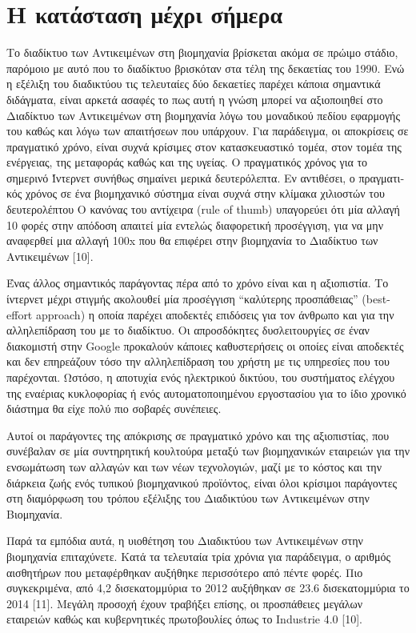 \section{Η κατάσταση μέχρι σήμερα}
Το διαδίκτυο των Αντικειμένων στη βιομηχανία βρίσκεται ακόμα σε πρώιμο στάδιο, παρόμοιο με αυτό που το διαδίκτυο βρισκόταν στα τέλη της δεκαετίας του 1990. Ενώ η εξέλιξη του διαδικτύου τις τελευταίες δύο δεκαετίες παρέχει κάποια σημαντικά διδάγματα, είναι αρκετά ασαφές το πως αυτή η γνώση μπορεί να αξιοποιηθεί στο Διαδίκτυο των Αντικειμένων στη βιομηχανία λόγω του μοναδικού πεδίου εφαρμογής του καθώς και λόγω των απαιτήσεων που υπάρχουν. Για παράδειγμα, οι αποκρίσεις σε πραγματικό χρόνο, είναι συχνά κρίσιμες στον κατασκευαστικό τομέα, στον τομέα της ενέργειας, της μεταφοράς καθώς και της υγείας. Ο πραγματικός χρόνος για το σημερινό Ίντερνετ συνήθως σημαίνει μερικά δευτερόλεπτα. Εν αντιθέσει, ο πραγματι­κός χρόνος σε ένα βιομηχανικό σύστημα είναι συχνά στην κλίμα­κα χιλιοστών του δευτερολέπτου Ο κανόνας του αντίχειρα (rule of thumb) υπαγορεύει ότι μία αλλαγή 10 φορές στην απόδοση απαι­τεί μία εντελώς διαφορετική προσέγγιση, για να μην αναφερθεί μια αλλαγή 100x  που θα επιφέρει στην βιομηχανία το Διαδίκτυο των Αντικειμένων [10].

Ένας άλλος σημαντικός παράγοντας πέρα από το χρόνο εί­ναι και η αξιοπιστία. Το ίντερνετ μέχρι στιγμής ακολουθεί μία προσέγγιση “καλύτερης προσπάθειας” (best-effort approach) η οποία παρέχει αποδεκτές επιδόσεις για τον άνθρωπο και για την αλληλεπίδραση του με το διαδίκτυο. Οι απροσδόκητες δυσλει­τουργίες σε έναν διακομιστή στην Google προκαλούν κάποιες κα­θυστερήσεις οι οποίες είναι αποδεκτές και δεν επηρεάζουν τόσο την αλληλεπίδραση του χρήστη με τις υπηρεσίες που του παρέχο­νται. Ωστόσο, η αποτυχία ενός ηλεκτρικού δικτύου, του συστήμα­τος ελέγχου της εναέριας κυκλοφορίας ή ενός αυτοματοποιημένου εργοστασίου για το ίδιο χρονικό διάστημα θα είχε πολύ πιο σοβα­ρές συνέπειες. 

Αυτοί οι παράγοντες της απόκρισης σε πραγματικό χρόνο και της αξιοπιστίας, που συνέβαλαν σε μία συντηρητική κουλτού­ρα μεταξύ των βιομηχανικών εταιρειών για την ενσωμάτωση των αλλαγών και των νέων τεχνολογιών, μαζί με το κόστος και την διάρκεια ζωής ενός τυπικού βιομηχανικού προϊόντος, είναι όλοι κρίσιμοι παράγοντες στη διαμόρφωση του τρόπου εξέλιξης του Διαδικτύου των Αντικειμένων στην Βιομηχανία.

Παρά τα εμπόδια αυτά, η υιοθέτηση του Διαδικτύου των Αντικειμένων στην βιομηχανία επιταχύνετε. Κατά τα τελευταία τρία χρόνια για παράδειγμα, ο αριθμός αισθητήρων που μεταφέρ­θηκαν αυξήθηκε περισσότερο από πέντε φορές. Πιο συγκεκρι­μένα, από 4,2 δισεκατομμύρια το 2012 αυξήθηκαν σε 23.6 δισεκα­τομμύρια το 2014 [11]. Μεγάλη προσοχή έχουν τραβήξει επίσης, οι προσπάθειες μεγάλων εταιρειών καθώς και κυβερνητικές πρω­τοβουλίες όπως το Industrie 4.0 [10].

